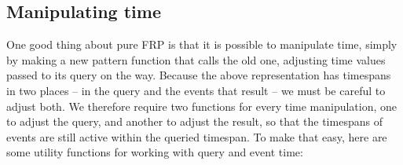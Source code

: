 \documentclass[
]{article}
\newenvironment{Shaded}{}{}
\newcommand{\DataTypeTok}[1]{\textcolor[rgb]{0.56,0.13,0.00}{#1}}
\newcommand{\DecValTok}[1]{\textcolor[rgb]{0.25,0.63,0.44}{#1}}
\newcommand{\FunctionTok}[1]{\textcolor[rgb]{0.02,0.16,0.49}{#1}}
\newcommand{\KeywordTok}[1]{\textcolor[rgb]{0.00,0.44,0.13}{\textbf{#1}}}
\newcommand{\NormalTok}[1]{#1}
\newcommand{\OperatorTok}[1]{\textcolor[rgb]{0.40,0.40,0.40}{#1}}
\newcommand{\OtherTok}[1]{\textcolor[rgb]{0.00,0.44,0.13}{#1}}
\begin{document}
\begin{Shaded}
\end{Shaded}

\subsection{Manipulating time}\label{manipulating-time}

One good thing about pure FRP is that it is possible to manipulate time,
simply by making a new pattern function that calls the old one,
adjusting time values passed to its query on the way. Because the above
representation has timespans in two places -- in the query and the
events that result -- we must be careful to adjust both. We therefore
require two functions for every time manipulation, one to adjust the
query, and another to adjust the result, so that the timespans of events
are still active within the queried timespan. To make that easy, here
are some utility functions for working with query and event time:
\end{document}
